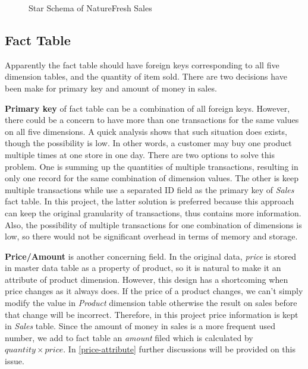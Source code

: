 \documentclass[
  a4paper,
]{article}
\begin{document}
\begin{figure}[htbp]
  \centering
  {
  \fontsize{9}{10}\selectfont
  \def\svgwidth{0.9\columnwidth}
    \resizebox{0.9\textwidth}{!}{}
  }
  \caption{Star Schema of NatureFresh Sales}
  \label{fig:overall}
\end{figure}

\hypertarget{fact-table}{%
\subsection{Fact Table}\label{fact-table}}

Apparently the fact table should have foreign keys corresponding to all
five dimension tables, and the quantity of item sold. There are two
decisions have been make for primary key and amount of money in sales.

\textbf{Primary key} of fact table can be a combination of all foreign
keys. However, there could be a concern to have more than one
transactions for the same values on all five dimensions. A quick
analysis shows that such situation does exists, though the possibility
is low. In other words, a customer may buy one product multiple times at
one store in one day. There are two options to solve this problem. One
is summing up the quantities of multiple transactions, resulting in only
one record for the same combination of dimension values. The other is
keep multiple transactions while use a separated ID field as the primary
key of \emph{Sales} fact table. In this project, the latter solution is
preferred because this approach can keep the original granularity of
transactions, thus contains more information. Also, the possibility of
multiple transactions for one combination of dimensions is low, so there
would not be significant overhead in terms of memory and storage.

\textbf{Price/Amount} is another concerning field. In the original data,
\emph{price} is stored in master data table as a property of product, so
it is natural to make it an attribute of product dimension. However,
this design has a shortcoming when price changes as it always does. If
the price of a product changes, we can't simply modify the value in
\emph{Product} dimension table otherwise the result on sales before that
change will be incorrect. Therefore, in this project price information
is kept in \emph{Sales} table. Since the amount of money in sales is a
more frequent used number, we add to fact table an \emph{amount} filed
which is calculated by \(\mathit{quantity}\times \mathit{price}\). In
\cref{price-attribute} further discussions will be provided on this
issue.
\end{document}
